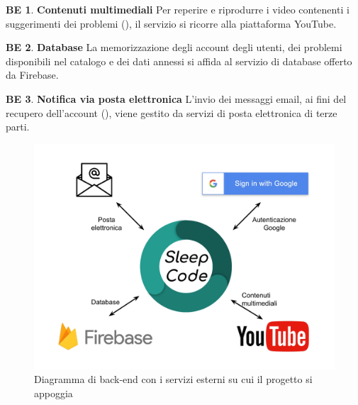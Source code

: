 \documentclass[11pt, a4paper]{article}
\theoremstyle{definition}
\newtheorem{backend}{BE}
\begin{document}
\begin{backend}
\textbf{Contenuti multimediali }
Per reperire e riprodurre i video contenenti i suggerimenti dei problemi (\textcolor{blue}{}),
il servizio si ricorre alla piattaforma YouTube.
\end{backend}

\begin{backend}
\textbf{Database }
La memorizzazione degli account degli utenti, dei problemi disponibili
nel catalogo e dei dati annessi si affida al servizio di database offerto
da Firebase.
\end{backend}

\begin{backend}
\textbf{Notifica via posta elettronica }
L'invio dei messaggi email, ai fini del recupero dell'account (\textcolor{blue}{}), viene gestito da servizi di posta elettronica di terze parti.
\end{backend}

\begin{figure}[H]
\centering
\includegraphics[scale=0.35]{materiale/immaginife/backend.pdf}
\caption{Diagramma di back-end con i servizi esterni su cui il progetto si appoggia}
\label{backend}
\end{figure}
\end{document}

